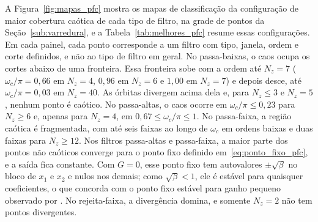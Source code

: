 \documentclass{pfccefsa}
\begin{document}
A Figura~\ref{fig:mapas_pfc} mostra os mapas de classificação da configuração de
maior cobertura caótica de cada tipo de filtro, na grade de pontos da
Seção~\ref{sub:varredura}, e a Tabela~\ref{tab:melhores_pfc} resume essas
configurações. Em cada painel, cada ponto corresponde a um filtro com tipo,
janela, ordem e corte definidos, e não ao tipo de filtro em geral. No passa-baixas, o caos ocupa os cortes abaixo
de uma fronteira. Essa fronteira sobe com a ordem até $N_z=7$
($\omega_c/\pi=0{,}66$ em $N_z=4$, $0{,}96$ em $N_z=6$ e $1{,}00$ em $N_z=7$) e
depois desce, até $\omega_c/\pi=0{,}03$ em $N_z=40$. As órbitas divergem acima
dela e, para $N_z\le3$ e $N_z=5$, nenhum ponto é caótico. No passa-altas, o caos ocorre em $\omega_c/\pi\le0{,}23$ para $N_z\ge6$
e, apenas para $N_z=4$, em $0{,}67\le\omega_c/\pi\le1$. No passa-faixa, a região
caótica é fragmentada, com até seis faixas ao longo de $\omega_c$ em ordens
baixas e duas faixas para $N_z\ge12$. Nos filtros passa-altas e passa-faixa, a maior parte dos pontos não caóticos
converge para o ponto fixo definido em~\eqref{eq:ponto_fixo_pfc}, e a saída fica
constante. Com $G=0$, esse ponto fixo tem autovalores $\pm\sqrt{\beta}$ no bloco
de $x_1$ e $x_2$ e nulos nos demais; como $\sqrt{\beta}<1$, ele é estável para
quaisquer coeficientes, o que concorda com o ponto fixo estável para ganho
pequeno observado por \textcite{BorgesCNSNS2024}. No rejeita-faixa, a divergência domina, e somente $N_z=2$ não tem
pontos divergentes.
\end{document}
